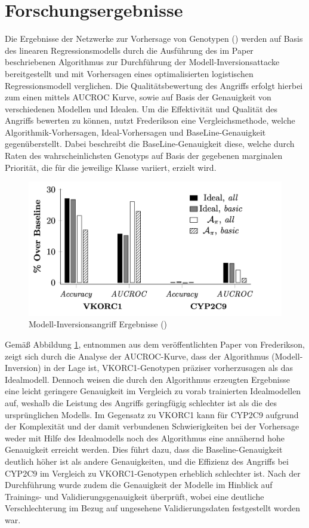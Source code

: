 \section{Forschungsergebnisse}\label{chpt:MIAttacksResearch}
Die Ergebnisse der Netzwerke zur Vorhersage von Genotypen (\cite[S. 7 ff.]{fredrikson_privacy_2014}) werden auf Basis des linearen Regressionsmodells durch die Ausführung des im Paper beschriebenen Algorithmus zur Durchführung der Modell-Inversionsattacke bereitgestellt und mit Vorhersagen eines optimalisierten logistischen Regressionsmodell verglichen. Die Qualitätsbewertung des Angriffs erfolgt hierbei zum einen mittels \glqq AUCROC\grqq{} Kurve, sowie auf Basis der Genauigkeit von verschiedenen Modellen und Idealen. Um die Effektivität und Qualität des Angriffs bewerten zu können, nutzt Frederikson eine Vergleichsmethode, welche Algorithmik-Vorhersagen, Ideal-Vorhersagen und BaseLine-Genauigkeit gegenüberstellt. Dabei beschreibt die BaseLine-Genauigkeit diese, welche durch Raten des wahrscheinlichsten Genotyps auf Basis der gegebenen marginalen Priorität, die für die jeweilige Klasse variiert, erzielt wird.
\begin{figure}[H]
	\centering
	\includegraphics[width=0.6\linewidth]{Bilder/paper_fred_2014_graph.png}
	\caption{Modell-Inversionsangriff Ergebnisse (\cite[S. 7, Figure 3]{fredrikson_privacy_2014})}
	\label{img:frederikson_evaluation}
\end{figure}
Gemäß Abbildung \ref{img:frederikson_evaluation}, entnommen aus dem veröffentlichten Paper von Frederikson, zeigt sich durch die Analyse der AUCROC-Kurve, dass der Algorithmus (Modell-Inversion) in der Lage ist, VKORC1-Genotypen präziser vorherzusagen als das Idealmodell. Dennoch weisen die durch den Algorithmus erzeugten Ergebnisse eine leicht geringere Genauigkeit im Vergleich zu vorab trainierten Idealmodellen auf, weshalb die Leistung des Angriffs geringfügig schlechter ist als die des ursprünglichen Modells.
Im Gegensatz zu VKORC1 kann für CYP2C9 aufgrund der Komplexität und der damit verbundenen Schwierigkeiten bei der Vorhersage weder mit Hilfe des Idealmodells noch des Algorithmus eine annähernd hohe Genauigkeit erreicht werden. Dies führt dazu, dass die Baseline-Genauigkeit deutlich höher ist als andere Genauigkeiten, und die Effizienz des Angriffs bei CYP2C9 im Vergleich zu VKORC1-Genotypen erheblich schlechter ist.
Nach der Durchführung wurde zudem die Genauigkeit der Modelle im Hinblick auf Trainings- und Validierungsgenauigkeit überprüft, wobei eine deutliche Verschlechterung im Bezug auf ungesehene Validierungsdaten festgestellt worden war.

